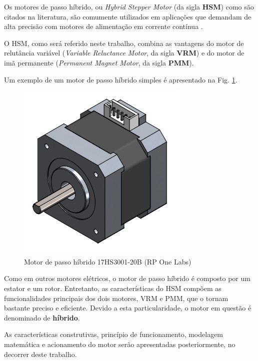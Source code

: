 Os motores de passo híbrido, ou \textit{Hybrid Stepper Motor} (da sigla \textbf{HSM}) como são citados na literatura, são comumente utilizados em aplicações que demandam de alta precisão com motores de alimentação em corrente contínua \cite{ieeeRusso}.
	
	O HSM, como será referido neste trabalho, combina as vantagens do motor de relutância variável (\textit{Variable Reluctance Motor}, da sigla \textbf{VRM}) e do motor de imã permanente (\textit{Permanent Magnet Motor}, da sigla \textbf{PMM}).
	
	Um exemplo de um motor de passo híbrido simples é apresentado na Fig. \ref{HSMgrafico}.
	
	\begin{figure}[!h]
		\centering
		\includegraphics[scale=0.5]{Images/HSMmodel.png}
		\caption{Motor de passo híbrido 17HS3001-20B (RP One Labs)}
		\label{HSMgrafico}
	\end{figure}  
	
	Como em outros motores elétricos, o motor de passo híbrido é composto por um estator e um rotor. Entretanto, as características do HSM compõem as funcionalidades principais dos dois motores, VRM e PMM, que o tornam bastante preciso e eficiente. Devido a esta particularidade, o motor em questão é denominado de \textbf{híbrido}.
	
	As características construtivas, princípio de funcionamento, modelagem matemática e acionamento do motor serão apresentadas posteriormente, no decorrer deste trabalho. 